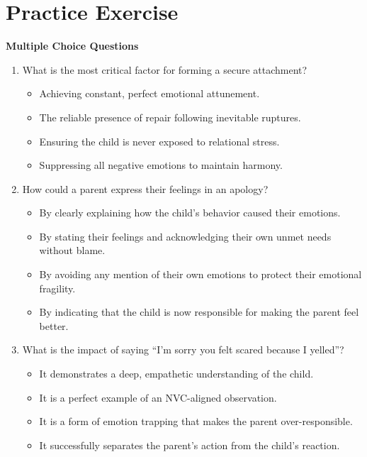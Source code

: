 \newpage
\section{Practice Exercise}
\begin{practiceexercise}
\textbf{Multiple Choice Questions}
\begin{enumerate}
  \item What is the most critical factor for forming a secure attachment?
    \begin{itemize}
      \item[A)] Achieving constant, perfect emotional attunement.
      \item[B)] The reliable presence of repair following inevitable ruptures.
      \item[C)] Ensuring the child is never exposed to relational stress.
      \item[D)] Suppressing all negative emotions to maintain harmony.
    \end{itemize}
  \vspace{\fill}
  \item How could a parent express their feelings in an apology?
    \begin{itemize}
      \item[A)] By clearly explaining how the child's behavior caused their emotions.
      \item[B)] By stating their feelings and acknowledging their own unmet needs without blame.
      \item[C)] By avoiding any mention of their own emotions to protect their emotional fragility.
      \item[D)] By indicating that the child is now responsible for making the parent feel better.
    \end{itemize}
  \vspace{\fill}
  \item What is the impact of saying ``I'm sorry you felt scared because I yelled''?
    \begin{itemize}
      \item[A)] It demonstrates a deep, empathetic understanding of the child.
      \item[B)] It is a perfect example of an NVC-aligned observation.
      \item[C)] It is a form of emotion trapping that makes the parent over-responsible.
      \item[D)] It successfully separates the parent's action from the child's reaction.
    \end{itemize}
\end{enumerate}
\vspace{\fill}
\newpage


\end{practiceexercise}
